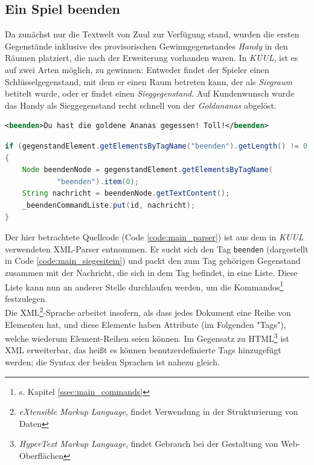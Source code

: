 \documentclass[12pt,twoside]{article}
\theoremstyle{plain}
\theoremstyle{definition}
\theoremstyle{remark}
\begin{document}
%
%

\subsection{Ein Spiel beenden}
\label{ssec:main_dev}
Da zunächst nur die Textwelt von Zuul zur Verfügung stand, wurden die ersten Gegenstände inklusive des provisorischen Gewinngegenstandes \textit{Handy} in den Räumen platziert, die nach der Erweiterung vorhanden waren.
In \textit{KUUL}, ist es auf zwei Arten möglich, zu gewinnen: Entweder findet der Spieler einen Schlüsselgegenstand, mit dem er einen Raum betreten kann, der als \textit{Siegraum} betitelt wurde, oder er findet einen \textit{Sieggegenstand}.
Auf Kundenwunsch wurde das Handy als Sieggegenstand recht schnell von der \textit{Goldananas} abgelöst.
\begin{lstlisting}[caption=XML-Tag für den Sieggegenstand, label=code:main_siegesitem, language=XML]
<beenden>Du hast die goldene Ananas gegessen! Toll!</beenden>
\end{lstlisting}
\begin{lstlisting}[caption=Entsprechender Auszug aus dem XML-Parser für Gegenstände, label={code:main_parser}, language=Java]
if (gegenstandElement.getElementsByTagName("beenden").getLength() != 0)
{
	Node beendenNode = gegenstandElement.getElementsByTagName(
			"beenden").item(0);
	String nachricht = beendenNode.getTextContent();
	_beendenCommandListe.put(id, nachricht);
}
\end{lstlisting}
Der hier betrachtete Quellcode (Code \ref{code:main_parser}) ist aus dem in \textit{KUUL} verwendeten XML-Parser entnommen.
Er sucht sich den Tag \texttt{beenden} (dargestellt in Code \ref{code:main_siegesitem}) und packt den zum Tag gehörigen Gegenstand zusammen mit der Nachricht, die sich in dem Tag befindet, in eine Liste. Diese Liste kann nun an anderer Stelle durchlaufen werden, um die Kommandos\footnote{s. Kapitel \ref{ssec:main_commands}} festzulegen.\\
Die XML\footnote{\textit{eXtensible Markup Language}, findet Verwendung in der Strukturierung von Daten}-Sprache arbeitet insofern, als dass jedes Dokument eine Reihe von Elementen hat, und diese Elemente haben Attribute (im Folgenden "Tags"), welche wiederum Element-Reihen seien können.
Im Gegensatz zu HTML\footnote{\textit{HyperText Markup Language}, findet Gebrauch bei der Gestaltung von Web-Oberflächen} ist XML erweiterbar, das heißt es können benutzerdefinierte Tags hinzugefügt werden; die Syntax der beiden Sprachen ist nahezu gleich.\\
\end{document}

